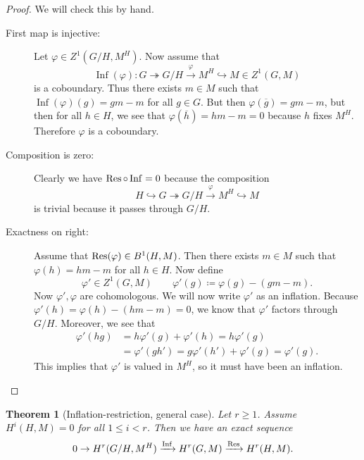 \documentclass[leqno, openany]{memoir}
\newtheorem{thm}{Theorem}[section]
\theoremstyle{definition}
\theoremstyle{remark}
\theoremstyle{plain}
\theoremstyle{definition}
\theoremstyle{remark}
\newcommand{\ol}[1]{\overline{#1}}
\DeclareMathOperator{\Inf}{Inf}
\begin{document}
\begin{proof}
    We will check this by hand.
    \begin{description}
        \item[First map is injective:] Let $\varphi \in Z^1(G/H, M^H)$. Now assume that 
            \[ \Inf(\varphi) \colon G \twoheadrightarrow G/H \xrightarrow{\varphi} M^H \hookrightarrow M \in Z^1(G, M)\]  
            is a coboundary. Thus there exists $m \in M$ such that $\Inf(\varphi) (g) = gm - m$ for all $g \in G$. But then $\varphi(\ol{g}) = gm - m$, but then for all $h \in H$, we see that $\varphi(\ol{h}) = hm-m = 0$ because $h$ fixes $M^H$. Therefore $\varphi$ is a coboundary.
        \item[Composition is zero:] Clearly we have $\Res \circ \Inf = 0$ because the composition
            \[ H \hookrightarrow G \twoheadrightarrow{G/H} \xrightarrow{\varphi} M^H \hookrightarrow M \]
            is trivial because it passes through $G/H$.
        \item[Exactness on right:] Assume that $\Res(\varphi) \in B^1(H, M)$. Then there exists $m \in M$ such that $\varphi(h) = hm - m$ for all $h \in H$. Now define 
            \[ \varphi' \in Z^1(G, M) \qquad \varphi'(g) \coloneqq \varphi(g) - (gm-m). \]
            Now $\varphi', \varphi$ are cohomologous. We will now write $\varphi'$ as an inflation. Because $\varphi'(h) = \varphi(h) - (hm-m) = 0$, we know that $\varphi'$ factors through $G/H$. Moreover, we see that
            \begin{align*}
                \varphi'(hg) &= h \varphi'(g) + \varphi'(h) = h \varphi'(g) \\
                             &= \varphi'(gh') = g \varphi'(h') + \varphi'(g) = \varphi'(g).
            \end{align*}
            This implies that $\varphi'$ is valued in $M^H$, so it must have been an inflation. \qedhere
    \end{description}
\end{proof}

\begin{thm}[Inflation-restriction, general case]
    Let $r \geq 1$. Assume $H^i(H, M) = 0$ for all $1 \leq i < r$. Then we have an exact sequence
    \[ 0 \to H^r(G/H, M^H) \xrightarrow{\Inf} H^r(G, M) \xrightarrow{\Res} H^r(H, M). \]
\end{thm}
\end{document}
